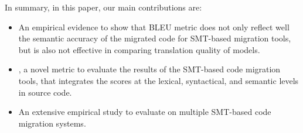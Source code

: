
In summary, in this paper, our main contributions are:

\begin{itemize}
	\item An empirical evidence to show that BLEU metric does not only reflect
well the semantic accuracy of the migrated code for SMT-based
migration tools, but is also not effective in comparing translation
quality of models.

	\item {\model}, a novel metric to evaluate the results of the SMT-based
code migration tools, that integrates the scores at the lexical,
syntactical, and semantic levels in source code.

	\item An extensive empirical study to evaluate {\model} on multiple SMT-based code migration systems.
\end{itemize}







